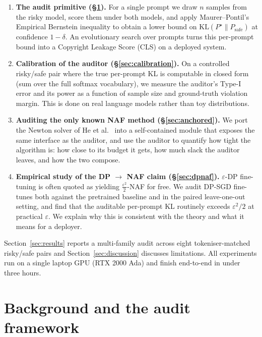 \documentclass{article}
\begin{document}
\begin{enumerate}\itemsep=2pt
  \item \textbf{The audit primitive (\S\ref{sec:framework}).}  For a single prompt we draw $n$ samples from the risky model, score them under both models, and apply Maurer--Pontil's Empirical Bernstein inequality to obtain a lower bound on $\mathrm{KL}(P^\star\|P_{\mathrm{safe}})$ at confidence $1-\delta$.  An evolutionary search over prompts turns this per-prompt bound into a Copyright Leakage Score (CLS) on a deployed system.
  \item \textbf{Calibration of the auditor (\S\ref{sec:calibration}).}  On a controlled risky/safe pair where the true per-prompt KL is computable in closed form (sum over the full softmax vocabulary), we measure the auditor's Type-I error and its power as a function of sample size and ground-truth violation margin.  This is done on real language models rather than toy distributions.
  \item \textbf{Auditing the only known NAF method (\S\ref{sec:anchored}).}  We port the Newton solver of He et al.~\cite{he2026anchored} into a self-contained module that exposes the same interface as the auditor, and use the auditor to quantify how tight the algorithm is: how close to its budget it gets, how much slack the auditor leaves, and how the two compose.
  \item \textbf{Empirical study of the DP $\to$ NAF claim (\S\ref{sec:dpnaf}).}  $\varepsilon$-DP fine-tuning is often quoted as yielding $\tfrac{\varepsilon^2}{2}$-NAF for free.  We audit DP-SGD fine-tunes both against the pretrained baseline and in the paired leave-one-out setting, and find that the auditable per-prompt KL routinely exceeds $\varepsilon^2/2$ at practical $\varepsilon$.  We explain why this is consistent with the theory and what it means for a deployer.
\end{enumerate}

Section~\ref{sec:results} reports a multi-family audit across eight tokeniser-matched risky/safe pairs and Section~\ref{sec:discussion} discusses limitations.  All experiments run on a single laptop GPU (RTX 2000 Ada) and finish end-to-end in under three hours.


\section{Background and the audit framework}
\label{sec:framework}
\end{document}
